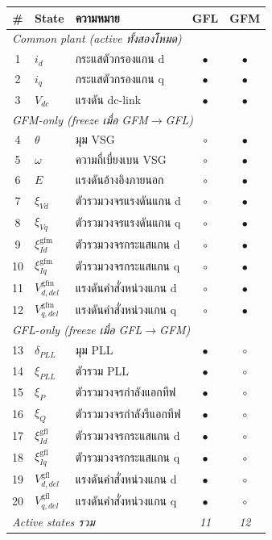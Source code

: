 \documentclass[12pt,a4paper]{article}
\begin{document}
\begin{center}
\small
{}
\label{tab:ibr-states-th}
\begin{tabular}{@{}c l l c c@{}}
\toprule
\# & State & ความหมาย & GFL & GFM \\
\midrule
\multicolumn{5}{l}{\textit{Common plant (active ทั้งสองโหมด)}}\\
1 & $i_d$ & กระแสตัวกรองแกน d & $\bullet$ & $\bullet$ \\
2 & $i_q$ & กระแสตัวกรองแกน q & $\bullet$ & $\bullet$ \\
3 & $V_{dc}$ & แรงดัน dc-link & $\bullet$ & $\bullet$ \\
\midrule
\multicolumn{5}{l}{\textit{GFM-only (freeze เมื่อ GFM$\to$GFL)}}\\
4 & $\theta$ & มุม VSG & $\circ$ & $\bullet$ \\
5 & $\omega$ & ความถี่เบี่ยงเบน VSG & $\circ$ & $\bullet$ \\
6 & $E$ & แรงดันอ้างอิงภายนอก & $\circ$ & $\bullet$ \\
7 & $\xi_{Vd}$ & ตัวรวมวงจรแรงดันแกน d & $\circ$ & $\bullet$ \\
8 & $\xi_{Vq}$ & ตัวรวมวงจรแรงดันแกน q & $\circ$ & $\bullet$ \\
9 & $\xi_{Id}^{\mathrm{gfm}}$ & ตัวรวมวงจรกระแสแกน d & $\circ$ & $\bullet$ \\
10 & $\xi_{Iq}^{\mathrm{gfm}}$ & ตัวรวมวงจรกระแสแกน q & $\circ$ & $\bullet$ \\
11 & $V_{d,del}^{\mathrm{gfm}}$ & แรงดันคำสั่งหน่วงแกน d & $\circ$ & $\bullet$ \\
12 & $V_{q,del}^{\mathrm{gfm}}$ & แรงดันคำสั่งหน่วงแกน q & $\circ$ & $\bullet$ \\
\midrule
\multicolumn{5}{l}{\textit{GFL-only (freeze เมื่อ GFL$\to$GFM)}}\\
13 & $\delta_{PLL}$ & มุม PLL & $\bullet$ & $\circ$ \\
14 & $\xi_{PLL}$ & ตัวรวม PLL & $\bullet$ & $\circ$ \\
15 & $\xi_{P}$ & ตัวรวมวงจรกำลังแอกทีฟ & $\bullet$ & $\circ$ \\
16 & $\xi_{Q}$ & ตัวรวมวงจรกำลังรีแอกทีฟ & $\bullet$ & $\circ$ \\
17 & $\xi_{Id}^{\mathrm{gfl}}$ & ตัวรวมวงจรกระแสแกน d & $\bullet$ & $\circ$ \\
18 & $\xi_{Iq}^{\mathrm{gfl}}$ & ตัวรวมวงจรกระแสแกน q & $\bullet$ & $\circ$ \\
19 & $V_{d,del}^{\mathrm{gfl}}$ & แรงดันคำสั่งหน่วงแกน d & $\bullet$ & $\circ$ \\
20 & $V_{q,del}^{\mathrm{gfl}}$ & แรงดันคำสั่งหน่วงแกน q & $\bullet$ & $\circ$ \\
\midrule
\multicolumn{3}{l}{\textit{Active states รวม}} & \textit{11} & \textit{12} \\
\bottomrule
\end{tabular}
\end{center}
\end{document}
